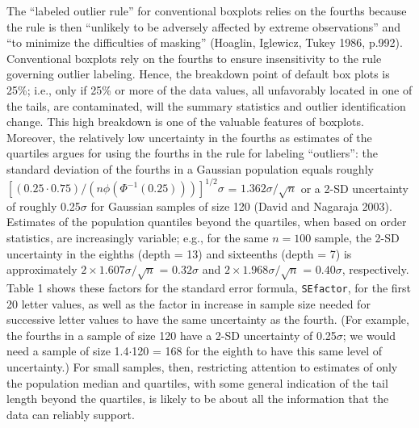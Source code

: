 \documentclass[oneside]{article}
\begin{document}
The ``labeled outlier rule'' for conventional boxplots relies 
on the fourths because the rule is then
``unlikely to be adversely affected by extreme
observations'' and ``to minimize the difficulties of masking'' 
(Hoaglin, Iglewicz, Tukey 1986, p.992).
Conventional boxplots rely on the fourths to ensure
insensitivity to the rule governing outlier labeling.
Hence, the breakdown point of default box plots is 25\%; 
i.e., only if 25\% or more of the data values, all unfavorably
located in one of the tails, are contaminated,
will the summary statistics and outlier identification change.
This high breakdown is one of the valuable features of boxplots.  
Moreover, the relatively low uncertainty in the fourths as 
estimates of the quartiles argues for using the fourths 
in the rule for labeling ``outliers'': the standard deviation 
of the fourths in a Gaussian population equals roughly 
$[(0.25 \cdot 0.75) / (n  \phi(\Phi^{-1}(0.25)))]^{1/2} \sigma$
= $1.362 \sigma / \sqrt{n}$ 
or a 2-SD uncertainty
of roughly 0.25$\sigma$ for Gaussian samples of size 120 
(David and Nagaraja 2003).
Estimates of the population quantiles beyond the quartiles, when
based on order statistics, are increasingly variable; e.g., for
the same $n = 100$ sample, the 2-SD uncertainty in the eighths
(depth = 13) and sixteenths (depth = 7) is approximately
$ 2 \times 1.607 \sigma / \sqrt{n}$ = $0.32 \sigma$ and
$ 2 \times 1.968 \sigma / \sqrt{n}$ = $0.40 \sigma$, respectively.
Table 1 shows these factors for the standard error formula,
\texttt{SEfactor}, for the first 20 letter values, as well as
the factor in increase in sample size needed for successive
letter values to have the same uncertainty as the fourth.
(For example, the fourths in a sample of size 120 have
a 2-SD uncertainty of 0.25$\sigma$; we would need a sample
of size 1.4$\cdot$120 = 168 for the eighth to have this
same level of uncertainty.)
For small samples, then, restricting attention to estimates of only
the population median and quartiles, with some general indication of 
the tail length beyond the quartiles, is likely to be about all the
information that the data can reliably support.
\end{document}
